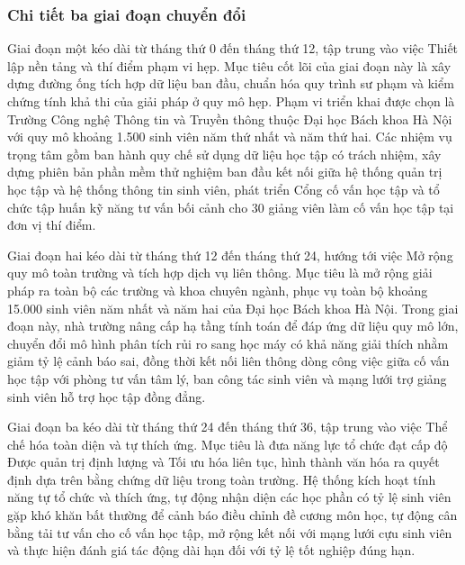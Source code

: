 \subsubsection{Chi tiết ba giai đoạn chuyển đổi}
Giai đoạn một kéo dài từ tháng thứ 0 đến tháng thứ 12, tập trung vào việc Thiết lập nền tảng và thí điểm phạm vi hẹp. Mục tiêu cốt lõi của giai đoạn này là xây dựng đường ống tích hợp dữ liệu ban đầu, chuẩn hóa quy trình sư phạm và kiểm chứng tính khả thi của giải pháp ở quy mô hẹp. Phạm vi triển khai được chọn là Trường Công nghệ Thông tin và Truyền thông thuộc Đại học Bách khoa Hà Nội với quy mô khoảng 1.500 sinh viên năm thứ nhất và năm thứ hai. Các nhiệm vụ trọng tâm gồm ban hành quy chế sử dụng dữ liệu học tập có trách nhiệm, xây dựng phiên bản phần mềm thử nghiệm ban đầu kết nối giữa hệ thống quản trị học tập và hệ thống thông tin sinh viên, phát triển Cổng cố vấn học tập và tổ chức tập huấn kỹ năng tư vấn bối cảnh cho 30 giảng viên làm cố vấn học tập tại đơn vị thí điểm.

Giai đoạn hai kéo dài từ tháng thứ 12 đến tháng thứ 24, hướng tới việc Mở rộng quy mô toàn trường và tích hợp dịch vụ liên thông. Mục tiêu là mở rộng giải pháp ra toàn bộ các trường và khoa chuyên ngành, phục vụ toàn bộ khoảng 15.000 sinh viên năm nhất và năm hai của Đại học Bách khoa Hà Nội. Trong giai đoạn này, nhà trường nâng cấp hạ tầng tính toán để đáp ứng dữ liệu quy mô lớn, chuyển đổi mô hình phân tích rủi ro sang học máy có khả năng giải thích nhằm giảm tỷ lệ cảnh báo sai, đồng thời kết nối liên thông dòng công việc giữa cố vấn học tập với phòng tư vấn tâm lý, ban công tác sinh viên và mạng lưới trợ giảng sinh viên hỗ trợ học tập đồng đẳng.

Giai đoạn ba kéo dài từ tháng thứ 24 đến tháng thứ 36, tập trung vào việc Thể chế hóa toàn diện và tự thích ứng. Mục tiêu là đưa năng lực tổ chức đạt cấp độ Được quản trị định lượng và Tối ưu hóa liên tục, hình thành văn hóa ra quyết định dựa trên bằng chứng dữ liệu trong toàn trường. Hệ thống kích hoạt tính năng tự tổ chức và thích ứng, tự động nhận diện các học phần có tỷ lệ sinh viên gặp khó khăn bất thường để cảnh báo điều chỉnh đề cương môn học, tự động cân bằng tải tư vấn cho cố vấn học tập, mở rộng kết nối với mạng lưới cựu sinh viên và thực hiện đánh giá tác động dài hạn đối với tỷ lệ tốt nghiệp đúng hạn.

